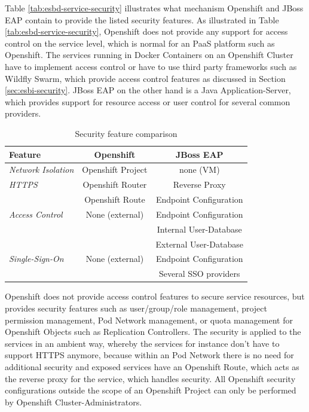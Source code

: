 Table \vref{tab:esbd-service-security} illustrates what mechanism Openshift and JBoss EAP contain to provide the listed security features. As illustrated in Table \vref{tab:esbd-service-security}, Openshift does not provide any support for access control on the service level, which is normal for an PaaS platform such as Openshift. The services running in Docker Containers on an Openshift Cluster have to implement access control or have to use third party frameworks such as Wildfly Swarm, which provide access control features as discussed in Section \vref{sec:esbi-security}. JBoss EAP on the other hand is a Java Application-Server, which provides support for resource access or user control for several common providers. 

{\renewcommand{\arraystretch}{1.2}%
	\begin{table}[h]
		\begin{tabularx}{\textwidth}{ X|c|c }	
			\textbf{Feature}                 & \textbf{Openshift}      & \textbf{JBoss EAP} \\  \hline
			\textit{Network Isolation}       & Openshift Project       & none (VM) \\  \hline
			\textit{HTTPS}                   & Openshift Router        & Reverse Proxy \\
			                                 & Openshift Route         & Endpoint Configuration \\  \hline
            \textit{Access Control}          & None (external)         & Endpoint Configuration \\
                                                                      && Internal User-Database \\ 
                                                                      && External User-Database \\  \hline
            \textit{Single-Sign-On}          & None (external)         & Endpoint Configuration \\
                                                                      && Several SSO providers \\  \hline
		\end{tabularx}
		\caption{Security feature comparison}
		\label{tab:esbd-service-security}
\end{table}}

Openshift does not provide access control features to secure service resources, but provides security features such as user/group/role management, project permission management, Pod Network management, or quota management for Openshift Objects such as Replication Controllers. The security is applied to the services in an ambient way, whereby the services for instance don't have to support HTTPS anymore, because within an Pod Network there is no need for additional security and exposed services have an Openshift Route, which acts as the reverse proxy for the service, which handles security. All Openshift security configurations outside the scope of an Openshift Project can only be performed by Openshift Cluster-Administrators. 

